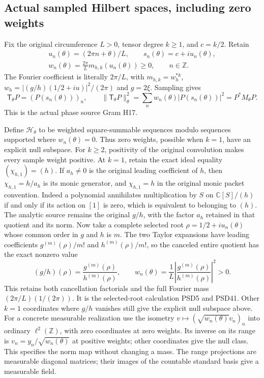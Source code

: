\documentclass[11pt,a4paper]{article}
\theoremstyle{definition}
\providecommand{\C}{\mathbb C}
\begin{document}
\subsection{Actual sampled Hilbert spaces, including zero weights}

Fix the original circumference $L>0$, tensor degree $k\ge1$,
and $c=k/2$. Retain
\[
 \begin{gathered}
 u_n(\theta)=(2\pi n+\theta)/L,\qquad
 s_n(\theta)=c+iu_n(\theta),\\
 w_n(\theta)=\frac{2\pi}{L}m_{h,k}(u_n(\theta))\ge0,
 \qquad n\in\mathbb Z.
 \end{gathered}
 \tag{HCD17}
\]
The Fourier coefficient is literally $2\pi/L$, with
$m_{h,k}=w_h^{*k}$, $w_h=|(g/h)(1/2+iu)|^2/(2\pi)$
and $g=2\xi$. Sampling gives
\[
 \mathsf T_\theta P=(P(s_n(\theta)))_n,\qquad
 \|\mathsf T_\theta P\|_\theta^2
 =\sum_n w_n(\theta)|P(s_n(\theta))|^2=P^*M_\theta P.
 \tag{HCD18}
\]
This is the actual phase source Gram H17.

Define $\mathcal H_\theta$ to be weighted square-summable
sequences modulo sequences supported where $w_n(\theta)=0$.
Thus zero weights, possible when $k=1$, have an explicit
null subspace. For $k\ge2$, positivity of the original
convolution makes every sample weight positive.
At $k=1$, retain the exact ideal equality
$(\chi_{h,1})=(h)$. If $a_h\ne0$ is the original leading
coefficient of $h$, then $\chi_{h,1}=h/a_h$ is its monic
generator, and $\chi_{h,1}=h$ in the original monic packet
convention. Indeed a polynomial annihilates multiplication by
$S$ on $\C[S]/(h)$ if and only if its action on $[1]$ is
zero, which is equivalent to belonging to $(h)$.
The analytic source remains the original $g/h$, with
the factor $a_h$ retained in that quotient and its norm.
Now take a complete selected root
$\rho=1/2+iu_n(\theta)$ whose common order in $g$ and $h$
is $m$. The two Taylor expansions have leading coefficients
$g^{(m)}(\rho)/m!$ and $h^{(m)}(\rho)/m!$, so the canceled
entire quotient has the exact nonzero value
\[
 (g/h)(\rho)=\frac{g^{(m)}(\rho)}{h^{(m)}(\rho)},\qquad
 w_n(\theta)=\frac1L
 \left|\frac{g^{(m)}(\rho)}{h^{(m)}(\rho)}\right|^2>0.
 \tag{HCD18a}
\]
This retains both cancellation factorials and the full
Fourier mass $(2\pi/L)(1/(2\pi))$. It is the selected-root
calculation PSD5 and PSD41. Other $k=1$ coordinates where
$g/h$ vanishes still give the explicit null subspace above.
For a concrete measurable realization use the isometry
$v\mapsto(\sqrt{w_n(\theta)}v_n)_n$ into ordinary
$\ell^2(\mathbb Z)$, with zero coordinates at zero weights.
Its inverse on its range is
$v_n=y_n/\sqrt{w_n(\theta)}$ at positive weights; other
coordinates give the null class. This specifies the norm
map without changing a mass. The range projections are
measurable diagonal matrices; their images of the countable
standard basis give a measurable field.
\end{document}
